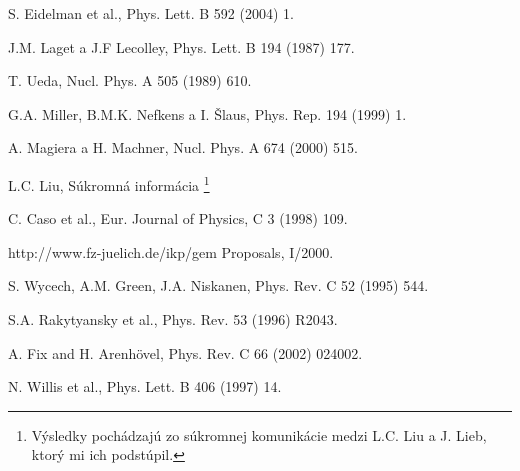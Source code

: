 \documentclass[12pt,oneside,slovak]{book}
\begin{document}
\begin{thebibliography}{99}  %

  S. Eidelman et al., Phys. Lett. B 592 (2004) 1.

  J.M. Laget a J.F Lecolley, Phys. Lett. B 194 (1987) 177.

  T. Ueda,  Nucl. Phys. A 505 (1989) 610.

  G.A. Miller, B.M.K. Nefkens a I. \v{S}laus, Phys. Rep. 194 (1999) 1.

  A. Magiera a H. Machner, Nucl. Phys. A 674 (2000) 515.

  L.C. Liu, Súkromná informácia \footnote{Výsledky pochádzajú zo súkromnej
    komunikácie medzi L.C. Liu a J. Lieb, ktorý mi ich podstúpil.}

  C. Caso et al., Eur. Journal of Physics, C 3 (1998) 109.

  http://www.fz-juelich.de/ikp/gem   Proposals, I/2000.

  S. Wycech, A.M. Green, J.A. Niskanen, Phys. Rev. C 52 (1995) 544.

  S.A. Rakytyansky et al., Phys. Rev. 53 (1996) R2043.

  A. Fix and H. Arenh\"{o}vel, Phys. Rev. C 66 (2002) 024002.

  N. Willis et al., Phys. Lett. B 406 (1997) 14.

\end{thebibliography}
\end{document}
